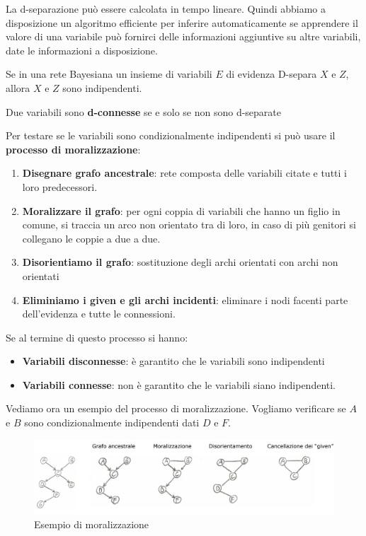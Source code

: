 La d-separazione può essere calcolata in tempo lineare. Quindi abbiamo a
disposizione un algoritmo efficiente per inferire automaticamente se apprendere
il valore di una variabile può fornirci delle informazioni aggiuntive su altre
variabili, date le informazioni a disposizione.
\begin{teorema} 
    Se in una rete Bayesiana un insieme di variabili $E$ di evidenza D-separa
    $X$ e $Z$, allora $X$ e $Z$ sono indipendenti.
\end{teorema}
\begin{definizione}
    Due variabili sono \textbf{d-connesse} se e solo se non sono d-separate
\end{definizione}
Per testare se le variabili sono condizionalmente indipendenti si può usare il
\textbf{processo di moralizzazione}:
\begin{enumerate}
    \item \textbf{Disegnare grafo ancestrale}: rete composta delle variabili
          citate e tutti i loro predecessori.
    \item \textbf{Moralizzare il grafo}: per ogni coppia di variabili che hanno
          un figlio in comune, si traccia un arco non orientato tra di loro, in
          caso di più genitori si collegano le coppie a due a due.
    \item \textbf{Disorientiamo il grafo}: sostituzione degli archi orientati
          con archi non orientati
    \item \textbf{Eliminiamo i given e gli archi incidenti}: eliminare i nodi
          facenti parte dell'evidenza e tutte le connessioni.
\end{enumerate}
Se al termine di questo processo si hanno:
\begin{itemize}
    \item \textbf{Variabili disconnesse}: è garantito che le variabili sono
          indipendenti
    \item \textbf{Variabili connesse}: non è garantito che le variabili siano
          indipendenti.
\end{itemize}
\begin{esempio}
    Vediamo ora un esempio del processo di moralizzazione. Vogliamo verificare
    se $A$ e $B$ sono condizionalmente indipendenti dati $D$ e $F$.
    \begin{figure}[!ht]
        \centering
        \includegraphics[width=1\textwidth]{./img/Reti/Moralizzazione.png}
        \caption{Esempio di moralizzazione}
        \label{fig:moralizzazione}
    \end{figure}
\end{esempio}
